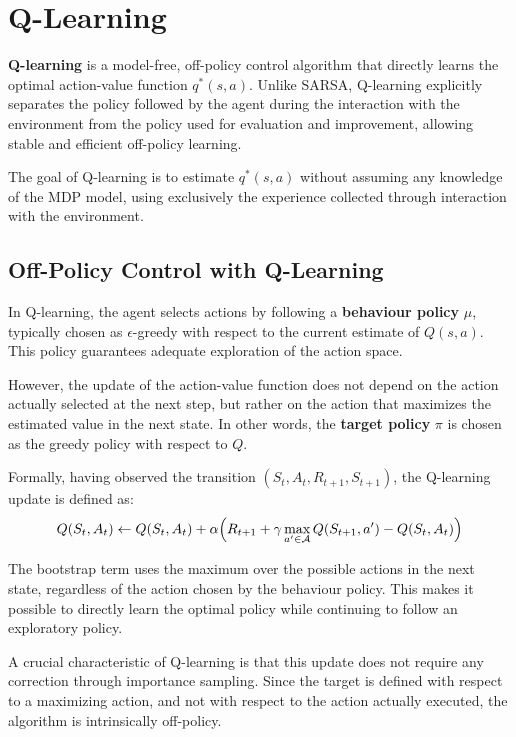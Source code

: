 \section{Q-Learning}

\textbf{Q-learning} is a model-free, off-policy control algorithm that directly learns the optimal action-value function $q^*(s,a)$. Unlike SARSA, Q-learning explicitly separates the policy followed by the agent during the interaction with the environment from the policy used for evaluation and improvement, allowing stable and efficient off-policy learning.

The goal of Q-learning is to estimate $q^*(s,a)$ without assuming any knowledge of the MDP model, using exclusively the experience collected through interaction with the environment.


\subsection{Off-Policy Control with Q-Learning}

In Q-learning, the agent selects actions by following a \textbf{behaviour policy} $\mu$, typically chosen as $\epsilon$-greedy with respect to the current estimate of $Q(s,a)$. This policy guarantees adequate exploration of the action space.

However, the update of the action-value function does not depend on the action actually selected at the next step, but rather on the action that maximizes the estimated value in the next state. In other words, the \textbf{target policy} $\pi$ is chosen as the greedy policy with respect to $Q$.

Formally, having observed the transition $(S_t, A_t, R_{t+1}, S_{t+1})$, the Q-learning update is defined as:
\[
Q(S_t, A_t)
\leftarrow
Q(S_t, A_t)
+
\alpha
\Bigl(
R_{t+1}
+
\gamma
\max_{a' \in \mathcal{A}}
Q(S_{t+1}, a')
-
Q(S_t, A_t)
\Bigr)
\]

The bootstrap term uses the maximum over the possible actions in the next state, regardless of the action chosen by the behaviour policy. This makes it possible to directly learn the optimal policy while continuing to follow an exploratory policy.

A crucial characteristic of Q-learning is that this update does not require any correction through importance sampling. Since the target is defined with respect to a maximizing action, and not with respect to the action actually executed, the algorithm is intrinsically off-policy.


